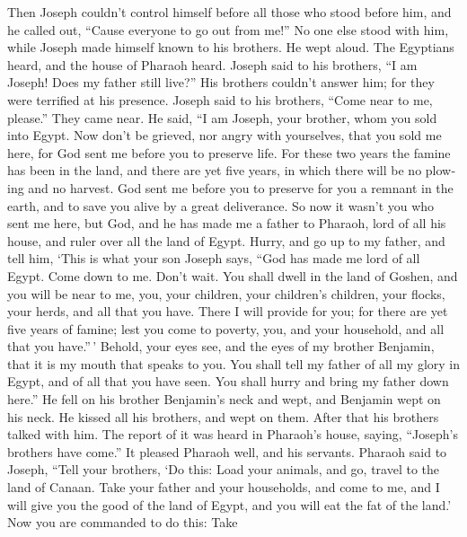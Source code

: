 \begin{paracol}{2}
\begin{otherlanguage}{english}
 Then Joseph couldn't control himself before all those who
stood before him, and he called out, ``Cause everyone to go out from
me!'' No one else stood with him, while Joseph made himself known to his
brothers.  He wept aloud. The Egyptians heard, and the
house of Pharaoh heard.  Joseph said to his brothers, ``I
am Joseph! Does my father still live?'' His brothers couldn't answer
him; for they were terrified at his presence.  Joseph said
to his brothers, ``Come near to me, please.'' They came near. He said,
``I am Joseph, your brother, whom you sold into Egypt. 
Now don't be grieved, nor angry with yourselves, that you sold me here,
for God sent me before you to preserve life.  For these
two years the famine has been in the land, and there are yet five years,
in which there will be no plowing and no harvest.  God
sent me before you to preserve for you a remnant in the earth, and to
save you alive by a great deliverance.  So now it wasn't
you who sent me here, but God, and he has made me a father to Pharaoh,
lord of all his house, and ruler over all the land of Egypt.
 Hurry, and go up to my father, and tell him, `This is
what your son Joseph says, ``God has made me lord of all Egypt. Come
down to me. Don't wait.  You shall dwell in the land of
Goshen, and you will be near to me, you, your children, your children's
children, your flocks, your herds, and all that you have.
 There I will provide for you; for there are yet five
years of famine; lest you come to poverty, you, and your household, and
all that you have.''\,'  Behold, your eyes see, and the
eyes of my brother Benjamin, that it is my mouth that speaks to you.
 You shall tell my father of all my glory in Egypt, and
of all that you have seen. You shall hurry and bring my father down
here.''  He fell on his brother Benjamin's neck and wept,
and Benjamin wept on his neck.  He kissed all his
brothers, and wept on them. After that his brothers talked with him.
 The report of it was heard in Pharaoh's house, saying,
``Joseph's brothers have come.'' It pleased Pharaoh well, and his
servants.  Pharaoh said to Joseph, ``Tell your brothers,
`Do this: Load your animals, and go, travel to the land of Canaan.
 Take your father and your households, and come to me,
and I will give you the good of the land of Egypt, and you will eat the
fat of the land.'  Now you are commanded to do this: Take

\end{otherlanguage}
\end{paracol}
